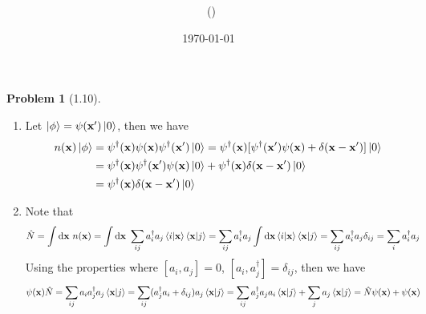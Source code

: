 \documentclass[twoside,11pt]{article}
\title{{\lms \Code \ \Ass}}
\author{\lms \name \ (\href{mailto:\mail}{\mail})}
\date{\sffamily \today}
\makeatletter
\renewcommand*\d{\mathop{}\!\mathrm{d}}
\theoremstyle{definition}
\newtheorem{problem}{Problem}
\theoremstyle{remark}
\newtheorem*{remark}{Remark}
\renewcommand{\maketitle}{\bgroup\setlength{\parindent}{0pt}
\begin{flushleft}
  \textbf{\Large\@title}

  \@author
\end{flushleft}\egroup
}
\makeatother
\begin{document}
\maketitle
\thispagestyle{title}


\begin{problem}[1.10]\
\begin{enumerate}[label=(\alph*)]
\item Let $\ket{\phi}=\psi(\mathbf{x}')\ket{0}$, then we have
\begin{align*}
    n(\mathbf{x})\ket{\phi} &= 
    \psi^\dagger(\mathbf{x})\psi(\mathbf{x})
    \psi^\dagger(\mathbf{x}')\ket{0}
    = \psi^\dagger(\mathbf{x})[
        \psi^\dagger(\mathbf{x}')\psi(\mathbf{x})
        + \delta(\mathbf{x}-\mathbf{x}')
    ]\ket{0}\\
    &= \psi^\dagger(\mathbf{x})\psi^\dagger(\mathbf{x}')\psi(\mathbf{x})\ket{0}
    + \psi^\dagger(\mathbf{x})\delta(\mathbf{x}-\mathbf{x}')\ket{0}\\
    &= \psi^\dagger(\mathbf{x})\delta(\mathbf{x}-\mathbf{x}')\ket{0}
\end{align*}

\item Note that
\begin{align*}
    \hat{N} &= 
    \int\d\mathbf{x}\ n(\mathbf{x})
    = \int\d\mathbf{x}\ \sum_{ij} a_i^\dagger a_j\braket{i|\mathbf{x}}\braket{\mathbf{x}|j}
    = \sum_{ij} a_i^\dagger a_j\int\d\mathbf{x}\braket{i|\mathbf{x}}\braket{\mathbf{x}|j}
    = \sum_{ij} a_i^\dagger a_j\delta_{ij}
    = \sum_i a_i^\dagger a_j
\end{align*}
Using the properties where $[a_i, a_j]=0$, $[a_i, a_j^\dagger]=\delta_{ij}$,
then we have
\begin{align*}
    \psi(\mathbf{x})\hat{N} &= 
    \sum_{ij}a_ia_j^\dagger a_j\braket{\mathbf{x}|j}
    = \sum_{ij}(a_j^\dagger a_i + \delta_{ij})a_j\braket{\mathbf{x}|j}
    = \sum_{ij}a_j^\dagger a_ja_i\braket{\mathbf{x}|j}
    + \sum_{j} a_j\braket{\mathbf{x}|j}
    = \hat{N}\psi(\mathbf{x}) + \psi(\mathbf{x})
\end{align*}

\end{enumerate}
\end{problem}
\end{document}

